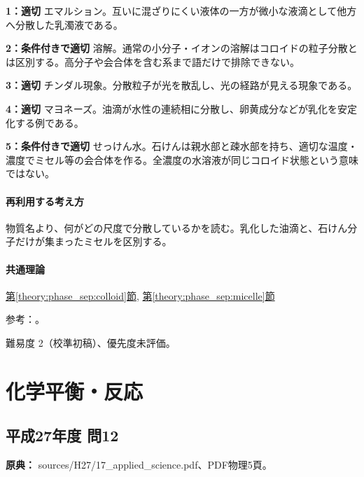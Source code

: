 \noindent\textbf{1：適切} エマルション。互いに混ざりにくい液体の一方が微小な液滴として他方へ分散した乳濁液である。\par

\noindent\textbf{2：条件付きで適切} 溶解。通常の小分子・イオンの溶解はコロイドの粒子分散とは区別する。高分子や会合体を含む系まで語だけで排除できない。\par

\noindent\textbf{3：適切} チンダル現象。分散粒子が光を散乱し、光の経路が見える現象である。\par

\noindent\textbf{4：適切} マヨネーズ。油滴が水性の連続相に分散し、卵黄成分などが乳化を安定化する例である。\par

\noindent\textbf{5：条件付きで適切} せっけん水。石けんは親水部と疎水部を持ち、適切な温度・濃度でミセル等の会合体を作る。全濃度の水溶液が同じコロイド状態という意味ではない。\par

\paragraph{再利用する考え方} 物質名より、何がどの尺度で分散しているかを読む。乳化した油滴と、石けん分子だけが集まったミセルを区別する。

\paragraph{共通理論} \hyperref[theory:phase_sep:colloid]{第\ref*{theory:phase_sep:colloid}節}, \hyperref[theory:phase_sep:micelle]{第\ref*{theory:phase_sep:micelle}節}

\par 参考：\cite{openstax_colloids}。

\par 難易度 2（校準初稿）、優先度未評価。

\section{化学平衡・反応}

\subsection{平成27年度 問12}
\label{q:h27-reg-applied-12}

\noindent\textbf{原典：} sources/H27/17\_applied\_science.pdf、PDF物理5頁。

